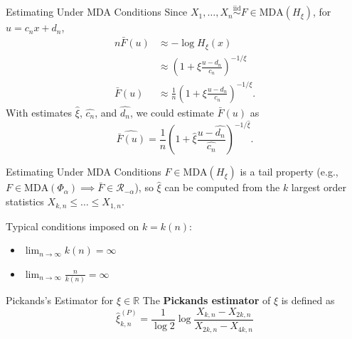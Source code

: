 \documentclass{beamer}
\newcommand{\MDA}{\text{MDA}}
\begin{document}
\begin{frame}{Estimating Under MDA Conditions}
    Since $X_1, \ldots, X_n \overset{\text{iid}}{\sim} F \in \MDA(H_{\xi})$, for $u = c_n x + d_n$,
    \begin{align*}
        n\bar{F}(u) &\approx -\log H_{\xi}(x) \\
        &\approx \left(1 + \xi\frac{u - d_n}{c_n}\right)^{-1 / \xi} \\
        \bar{F}(u) &\approx \frac{1}{n}\left(1 + \xi\frac{u - d_n}{c_n}\right)^{-1 / \xi}.
    \end{align*}
    With estimates $\hat{\xi}$, $\hat{c_n}$, and $\hat{d_n}$, we could estimate $\bar{F}(u)$ as
    \[
    \widehat{\bar{F}(u)} = \frac{1}{n}\left(1 + \hat{\xi}\frac{u - \hat{d_n}}{\hat{c_n}}\right)^{-1 / \hat{\xi}}.
    \]
\end{frame}

\begin{frame}{Estimating Under MDA Conditions}
    $F \in \MDA(H_{\xi})$ is a tail property (e.g., $F \in \MDA(\Phi_{\alpha}) \implies \bar{F} \in \mathcal{R}_{-\alpha}$), so $\hat{\xi}$ can be computed from the $k$ largest order statistics $X_{k, n} \le \ldots \le X_{1, n}$.

    \medskip

    Typical conditions imposed on $k = k(n)$:
    \begin{itemize}
        \item $\lim_{n \to \infty} k(n) = \infty$
        \item $\lim_{n \to \infty} \frac{n}{k(n)} = \infty$
    \end{itemize}
\end{frame}

\begin{frame}{Pickands's Estimator for $\xi \in \mathbb{R}$}
    The \textbf{Pickands estimator} of $\xi$ is defined as
    \[
    \hat{\xi}_{k, n}^{(P)} = \frac{1}{\log 2}\log\frac{X_{k, n} - X_{2 k, n}}{X_{2 k, n} - X_{4 k, n}}
    \]
\end{frame}
\end{document}
